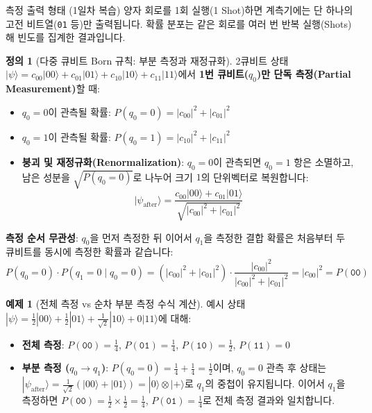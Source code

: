 \documentclass[11pt, a4paper]{article}
\newcommand{\ket}[1]{|#1\rangle}
\theoremstyle{definition}
\newtheorem{definition}{정의}[section]
\newtheorem{example}{예제}[section]
\begin{document}
\begin{cautionbox}{측정 출력 형태 (1일차 복습)}
양자 회로를 1회 실행(1 Shot)하면 계측기에는 단 하나의 고전 비트열(\texttt{01} 등)만 출력됩니다. 확률 분포는 같은 회로를 여러 번 반복 실행(Shots)해 빈도를 집계한 결과입니다.
\end{cautionbox}

\begin{definition}[다중 큐비트 Born 규칙: 부분 측정과 재정규화]
2큐비트 상태 $\ket{\psi} = c_{00}\ket{00} + c_{01}\ket{01} + c_{10}\ket{10} + c_{11}\ket{11}$에서 \textbf{1번 큐비트($q_0$)만 단독 측정(Partial Measurement)}할 때:
\begin{itemize}
    \item $q_0 = 0$이 관측될 확률: $P(q_0=0) = |c_{00}|^2 + |c_{01}|^2$
    \item $q_0 = 1$이 관측될 확률: $P(q_0=1) = |c_{10}|^2 + |c_{11}|^2$
    \item \textbf{붕괴 및 재정규화(Renormalization)}: $q_0 = 0$이 관측되면 $q_0=1$ 항은 소멸하고, 남은 성분을 $\sqrt{P(q_0=0)}$로 나누어 크기 $1$의 단위벡터로 복원합니다:
    $$\ket{\psi_{\text{after}}} = \frac{c_{00}\ket{00} + c_{01}\ket{01}}{\sqrt{|c_{00}|^2 + |c_{01}|^2}}$$
\end{itemize}
\textbf{측정 순서 무관성}: $q_0$을 먼저 측정한 뒤 이어서 $q_1$을 측정한 결합 확률은 처음부터 두 큐비트를 동시에 측정한 확률과 같습니다:
$$P(q_0=0) \cdot P(q_1=0 \mid q_0=0) = (|c_{00}|^2+|c_{01}|^2) \cdot \frac{|c_{00}|^2}{|c_{00}|^2+|c_{01}|^2} = |c_{00}|^2 = P(\texttt{00})$$
\end{definition}

\begin{example}[전체 측정 vs 순차 부분 측정 수식 계산]
예시 상태 $\ket{\psi} = \frac{1}{2}\ket{00} + \frac{1}{2}\ket{01} + \frac{1}{\sqrt{2}}\ket{10} + 0\ket{11}$에 대해:
\begin{itemize}
    \item \textbf{전체 측정}: $P(\texttt{00}) = \frac{1}{4}$, $P(\texttt{01}) = \frac{1}{4}$, $P(\texttt{10}) = \frac{1}{2}$, $P(\texttt{11}) = 0$
    \item \textbf{부분 측정 ($q_0 \to q_1$)}: $P(q_0=0) = \frac{1}{4}+\frac{1}{4} = \frac{1}{2}$이며, $q_0=0$ 관측 후 상태는 $\ket{\psi_{\text{after}}} = \frac{1}{\sqrt{2}}(\ket{00}+\ket{01}) = \ket{0}\otimes\ket{+}$로 $q_1$의 중첩이 유지됩니다. 이어서 $q_1$을 측정하면 $P(\texttt{00}) = \frac{1}{2}\times\frac{1}{2} = \frac{1}{4}$, $P(\texttt{01}) = \frac{1}{4}$로 전체 측정 결과와 일치합니다.
\end{itemize}
\end{example}
\end{document}
